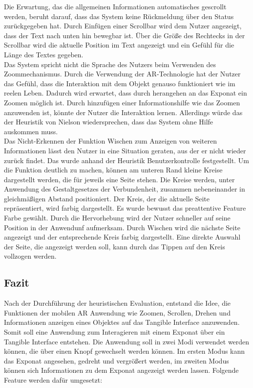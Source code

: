 \documentclass[runningheads,a4paper]{llncs}
\begin{document}
Die Erwartung, das die allgemeinen Informationen automatisches gescrollt werden, beruht darauf, dass das System keine Rückmeldung über den Status zurückgegeben hat. Durch Einfügen einer Scrollbar wird dem Nutzer angezeigt, dass der Text nach unten hin bewegbar ist. Über die Größe des Rechtecks in der Scrollbar wird die aktuelle Position im Text angezeigt und ein Gefühl für die Länge des Textes gegeben.\\

Das System spricht nicht die Sprache des Nutzers beim Verwenden des Zoommechanismus. Durch die Verwendung der AR-Technologie hat der Nutzer das Gefühl, dass die Interaktion mit dem Objekt genauso funktioniert wie im reelen Leben. Dadurch wird erwartet, dass durch herangehen an das Exponat ein Zoomen möglich ist. Durch hinzufügen einer Informationshilfe wie das Zoomen anzuwenden ist, könnte der Nutzer die Interaktion lernen. Allerdings würde das der Heuristik von Nielson wiedersprechen, dass das System ohne Hilfe auskommen muss.\\

Das Nicht-Erkennen der Funktion Wischen zum Anzeigen von weiteren Informationen lässt den Nutzer in eine Situation geraten, aus der er nicht wieder zurück findet. Das wurde anhand der Heuristik Benutzerkontrolle festgestellt. Um die Funktion deutlich zu machen, können am unteren Rand kleine Kreise dargestellt werden, die für jeweils eine Seite stehen. Die Kreise werden, unter Anwendung des Gestaltgesetzes der Verbundenheit, zusammen nebeneinander in gleichmäßigen Abstand positioniert. Der Kreis, der die aktuelle Seite repräsentiert, wird farbig dargestellt. Es wurde bewusst das preattentive Feature Farbe gewählt. Durch die Hervorhebung wird der Nutzer schneller auf seine Position in der Anwendunf aufmerksam. Durch Wischen wird die nächste Seite angezeigt und der entsprechende Kreis farbig dargestellt. Eine direkte Auswahl der Seite, die angezeigt werden soll, kann durch das Tippen auf den Kreis vollzogen werden.\\


\subsection{Fazit}
Nach der Durchführung der heuristischen Evaluation, entstand die Idee, die Funktionen  der mobilen AR Anwendung wie Zoomen, Scrollen, Drehen und Informationen anzeigen eines Objektes auf das Tangible Interface anzuwenden. Somit soll eine Anwendung zum Interagieren mit einem Exponat über ein Tangible Interface entstehen. Die Anwendung soll in zwei Modi verwendet werden können, die über einen Knopf gewechselt werden können. Im ersten Modus kann das Exponat angesehen, gedreht und vergrößert werden, im zweiten Modus können sich Informationen zu dem Exponat angezeigt werden lassen. Folgende Feature werden dafür umgesetzt:
\end{document}
